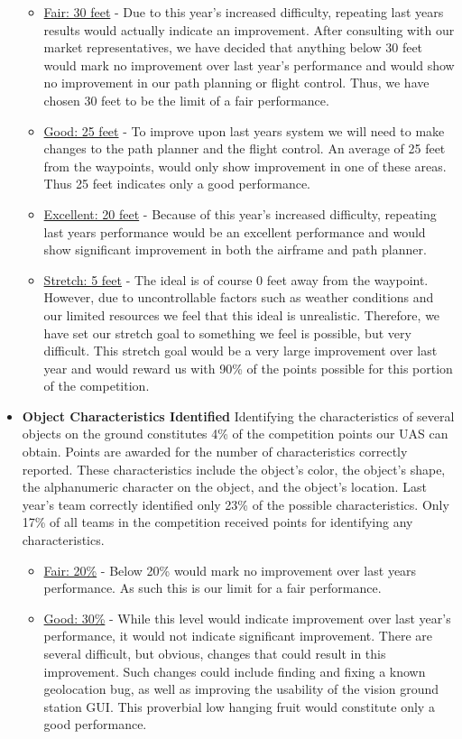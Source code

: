 \documentclass[]{auvsi_doc}
\begin{document}
\begin{itemize}
	\begin{itemize}
	\item  \underline{Fair: 30 feet} -  Due to this year's increased difficulty, repeating last years results would actually indicate an improvement. After consulting with our market representatives, we have decided that anything below 30 feet would mark no improvement over last year's performance and would show no improvement in our path planning or flight control. Thus, we have chosen 30 feet to be the limit of a fair performance. 
	\item \underline{Good: 25 feet} -  To improve upon last years system we will need to make changes to the path planner and the flight control. An average of 25 feet from the waypoints, would only show improvement in one of these areas. Thus 25 feet indicates only a good performance.
	\item \underline{Excellent: 20 feet} -  Because of this year's increased difficulty, repeating last years performance would be an excellent performance and would show significant improvement in both the airframe and path planner.
	\item \underline{Stretch: 5 feet} -  The ideal is of course 0 feet away from the waypoint. However, due to uncontrollable factors such as weather conditions and our limited resources we feel that this ideal is unrealistic. Therefore, we have set our stretch goal to something we feel is possible, but very difficult. This stretch goal would be a very large improvement over last year and would reward us with 90\% of the points possible for this portion of the competition. 
	\end{itemize}
\item \textbf{Object Characteristics Identified} Identifying the characteristics of several objects on the ground constitutes 4\% of the competition points our UAS can obtain. Points are awarded for the number of characteristics correctly reported. These characteristics include the object's color, the object's shape, the alphanumeric character on the object, and the object's location. Last year's team correctly identified only 23\% of the possible characteristics. Only 17\% of all teams in the competition received points for identifying any characteristics.
	\begin{itemize}
	\item  \underline{Fair: 20\%} -  Below 20\% would mark no improvement over last years performance. As such this is our limit for a fair performance.
	\item \underline{Good: 30\%} -  While this level would indicate improvement over last year's performance, it would not indicate significant improvement. There are several difficult, but obvious, changes that could result in this improvement. Such changes could include finding and fixing a known geolocation bug, as well as improving the usability of the vision ground station GUI. This proverbial low hanging fruit would constitute only a good performance.

\end{itemize}
\end{itemize}
\end{document}
